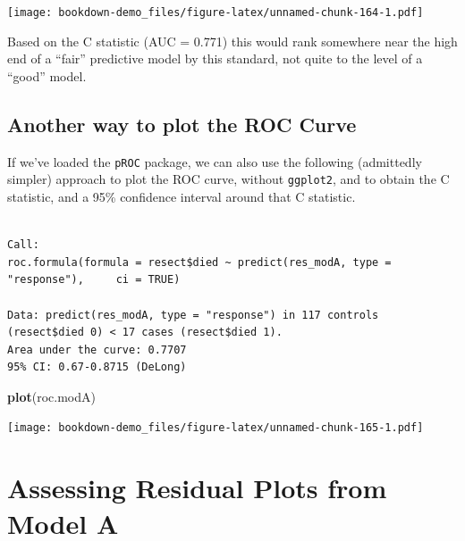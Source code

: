 \documentclass[]{book}
\newenvironment{Shaded}{\begin{snugshade}}{\end{snugshade}}
\newcommand{\KeywordTok}[1]{\textcolor[rgb]{0.13,0.29,0.53}{\textbf{#1}}}
\newcommand{\DataTypeTok}[1]{\textcolor[rgb]{0.13,0.29,0.53}{#1}}
\newcommand{\StringTok}[1]{\textcolor[rgb]{0.31,0.60,0.02}{#1}}
\newcommand{\OtherTok}[1]{\textcolor[rgb]{0.56,0.35,0.01}{#1}}
\newcommand{\OperatorTok}[1]{\textcolor[rgb]{0.81,0.36,0.00}{\textbf{#1}}}
\newcommand{\NormalTok}[1]{#1}
\theoremstyle{definition}
\theoremstyle{definition}
\theoremstyle{definition}
\theoremstyle{remark}
\begin{document}
\texttt{[image: bookdown-demo\_files/figure-latex/unnamed-chunk-164-1.pdf]}

Based on the C statistic (AUC = 0.771) this would rank somewhere near
the high end of a ``fair'' predictive model by this standard, not quite
to the level of a ``good'' model.

\subsection{Another way to plot the ROC
Curve}\label{another-way-to-plot-the-roc-curve}

If we've loaded the \texttt{pROC} package, we can also use the following
(admittedly simpler) approach to plot the ROC curve, without
\texttt{ggplot2}, and to obtain the C statistic, and a 95\% confidence
interval around that C statistic.

\begin{Shaded}
\end{Shaded}

\begin{verbatim}

Call:
roc.formula(formula = resect$died ~ predict(res_modA, type = "response"),     ci = TRUE)

Data: predict(res_modA, type = "response") in 117 controls (resect$died 0) < 17 cases (resect$died 1).
Area under the curve: 0.7707
95% CI: 0.67-0.8715 (DeLong)
\end{verbatim}

\begin{Shaded}
\begin{Highlighting}[]
\KeywordTok{plot}\NormalTok{(roc.modA)}
\end{Highlighting}
\end{Shaded}

\texttt{[image: bookdown-demo\_files/figure-latex/unnamed-chunk-165-1.pdf]}

\section{Assessing Residual Plots from Model
A}\label{assessing-residual-plots-from-model-a}
\end{document}
